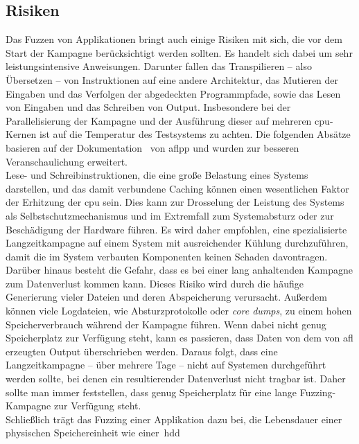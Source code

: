 \subsection{Risiken}\label{subsec:risiken}
Das Fuzzen von Applikationen bringt auch einige Risiken mit sich, die vor dem Start der Kampagne berücksichtigt werden sollten.
Es handelt sich dabei um sehr leistungsintensive Anweisungen.
Darunter fallen das Transpilieren -- also Übersetzen -- von Instruktionen auf eine andere Architektur,
das Mutieren der Eingaben und das Verfolgen der abgedeckten Programmpfade, sowie das Lesen von Eingaben und das Schreiben von Output.
Insbesondere bei der Parallelisierung der Kampagne und der Ausführung dieser auf mehreren \gls{cpu}-Kernen ist auf die Temperatur
des Testsystems zu achten.
Die folgenden Absätze basieren auf der Dokumentation~\cite{fuzzing-risks} von \gls{aflpp} und wurden zur besseren
Veranschaulichung erweitert. \\
\linebreak
Lese- und Schreibinstruktionen, die eine große Belastung eines Systems darstellen, und das damit verbundene Caching
können einen wesentlichen Faktor der Erhitzung der \gls{cpu} sein.
Dies kann zur Drosselung der Leistung des Systems als Selbstschutzmechanismus und im Extremfall zum
Systemabsturz oder zur Beschädigung der Hardware führen.
Es wird daher empfohlen, eine spezialisierte Langzeitkampagne auf einem System mit ausreichender Kühlung durchzuführen,
damit die im System verbauten Komponenten keinen Schaden davontragen. \\
\linebreak
Darüber hinaus besteht die Gefahr, dass es bei einer lang anhaltenden Kampagne zum Datenverlust kommen kann.
Dieses Risiko wird durch die häufige Generierung vieler Dateien und deren Abspeicherung verursacht.
Außerdem können viele Logdateien, wie Absturzprotokolle oder \textit{core dumps}, zu einem hohen Speicherverbrauch während
der Kampagne führen.
Wenn dabei nicht genug Speicherplatz zur Verfügung steht, kann es passieren, dass Daten von dem von \gls{afl} erzeugten
Output überschrieben werden.
Daraus folgt, dass eine Langzeitkampagne -- über mehrere Tage -- nicht auf Systemen durchgeführt werden sollte, bei denen
ein resultierender Datenverlust nicht tragbar ist.
Daher sollte man immer feststellen, dass genug Speicherplatz für eine lange Fuzzing-Kampagne zur Verfügung steht. \\
\linebreak
Schließlich trägt das Fuzzing einer Applikation dazu bei, die Lebensdauer einer physischen Speichereinheit wie einer~\gls{hdd}
